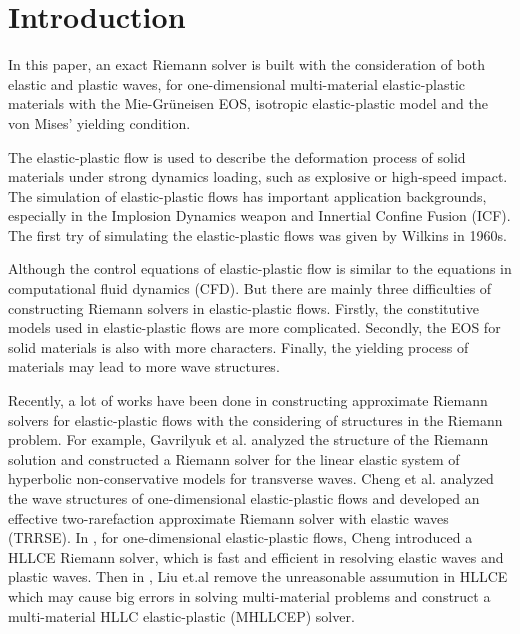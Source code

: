 \documentclass[review]{elsarticle}
\begin{document}

\section{Introduction}

In this paper, an exact  Riemann solver is built with the consideration of both elastic and plastic waves, for one-dimensional  multi-material elastic-plastic materials with the Mie-Gr\"uneisen EOS, isotropic elastic-plastic model \cite{wilkins1963calculation} and  the von Mises' yielding condition.

The  elastic-plastic flow  is  used to describe the deformation process of solid materials under strong dynamics loading, such as explosive or high-speed impact. The simulation of elastic-plastic flows has important application backgrounds, especially in the Implosion Dynamics weapon and Innertial Confine Fusion (ICF). The first try of simulating the elastic-plastic flows was given by  Wilkins \cite{wilkins1963calculation} in 1960s.  

Although the control equations of elastic-plastic flow is similar to the equations in computational fluid dynamics (CFD). But there are mainly three difficulties  of constructing  Riemann solvers in elastic-plastic flows.  Firstly, the constitutive models used in elastic-plastic flows are more complicated. Secondly, the EOS for solid materials is also with more characters. Finally, the yielding process of materials may lead to more wave structures.

Recently, a lot of works have been done in constructing  approximate Riemann solvers for elastic-plastic flows with the considering of structures in the Riemann problem.  For example, Gavrilyuk et al. \cite{gavrilyuk2008modelling} analyzed the structure of the Riemann solution and constructed a Riemann solver for the linear elastic system  of hyperbolic non-conservative models for transverse waves.   Cheng et al. \cite{cheng2015high} analyzed the wave structures of one-dimensional elastic-plastic flows and developed an effective two-rarefaction approximate Riemann solver with elastic waves (TRRSE). 
In \cite{cheng2016harten}, for one-dimensional elastic-plastic flows, Cheng introduced a HLLCE Riemann solver, which is fast and efficient in resolving elastic waves and plastic waves. Then in \cite{liumulti}, Liu et.al remove the unreasonable assumution in HLLCE  which may cause big errors in solving  multi-material problems and construct a multi-material HLLC elastic-plastic (MHLLCEP) solver. 
\end{document}
